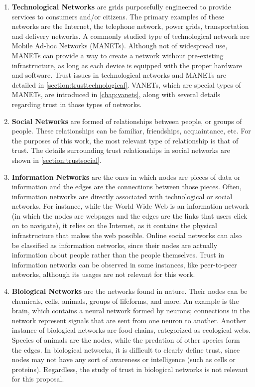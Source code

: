 \begin{enumerate}
	\item \textbf{Technological Networks} are grids purposefully engineered to provide services to consumers and/or citizens.
	 	The primary examples of these networks are the Internet, the telephone network, power grids, transportation and delivery networks.
	 	A commonly studied type of technological network are Mobile Ad-hoc Networks (MANETs).
		Although not of widespread use, MANETs can provide a way to create a network without pre-existing infrastructure, as long as each device is equipped with the proper hardware and software.
		Trust issues in technological networks and MANETs are detailed in \autoref{section:trusttechnological}.
		VANETs, which are special types of MANETs, are introduced in \autoref{chap:vanets}, along with several details regarding trust in those types of networks.
	\item \textbf{Social Networks} are formed of relationships between people, or groups of people.
		These relationships can be familiar, friendships, acquaintance, etc.
		For the purposes of this work, the most relevant type of relationship is that of trust.
		The details surrounding trust relationships in social networks are shown in \autoref{section:trustsocial}.
	\item \textbf{Information Networks} are the ones in which nodes are pieces of data or information and the edges are the connections between those pieces.
		Often, information networks are directly associated with technological or social networks.
		For instance, while the World Wide Web is an information network (in which the nodes are webpages and the edges are the links that users click on to navigate), it relies on the Internet, as it contains the physical infrastructure that makes the web possible.
		Online social networks can also be classified as information networks, since their nodes are actually information about people rather than the people themselves.
		Trust in information networks can be observed in some instances, like peer-to-peer networks, although its usages are not relevant for this work.
	\item \textbf{Biological Networks} are the networks found in nature.
		Their nodes can be chemicals, cells, animals, groups of lifeforms, and more.
		An example is the brain, which contains a neural network formed by neurons; connections in the network represent signals that are sent from one neuron to another.
		Another instance of biological networks are food chains, categorized as ecological webs.
		Species of animals are the nodes, while the predation of other species form the edges.
		In biological networks, it is difficult to clearly define trust, since nodes may not have any sort of awareness or intelligence (such as cells or proteins).
		Regardless, the study of trust in biological networks is not relevant for this proposal.
		
\end{enumerate}

